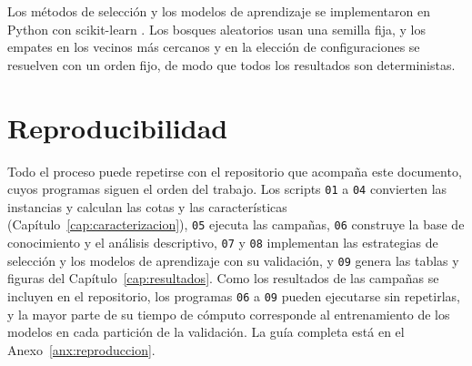 Los métodos de selección y los modelos de aprendizaje se implementaron en
Python con scikit-learn \citep{pedregosa2011}. Los bosques aleatorios usan una
semilla fija, y los empates en los vecinos más cercanos y en la elección de
configuraciones se resuelven con un orden fijo, de modo que todos los
resultados son deterministas.

\section{Reproducibilidad}
\label{sec:reproducibilidad}

Todo el proceso puede repetirse con el repositorio que acompaña este
documento, cuyos programas siguen el orden del trabajo. Los scripts \texttt{01}
a \texttt{04} convierten las instancias y calculan las cotas y las
características (Capítulo~\ref{cap:caracterizacion}), \texttt{05} ejecuta las
campañas, \texttt{06} construye la base de conocimiento y el análisis
descriptivo, \texttt{07} y \texttt{08} implementan las estrategias de selección
y los modelos de aprendizaje con su validación, y \texttt{09} genera las tablas
y figuras del Capítulo~\ref{cap:resultados}. Como los resultados de las
campañas se incluyen en el repositorio, los programas \texttt{06} a \texttt{09}
pueden ejecutarse sin repetirlas, y la mayor parte de su tiempo de cómputo
corresponde al entrenamiento de los modelos en cada partición de la
validación. La guía completa está en el Anexo~\ref{anx:reproduccion}.
